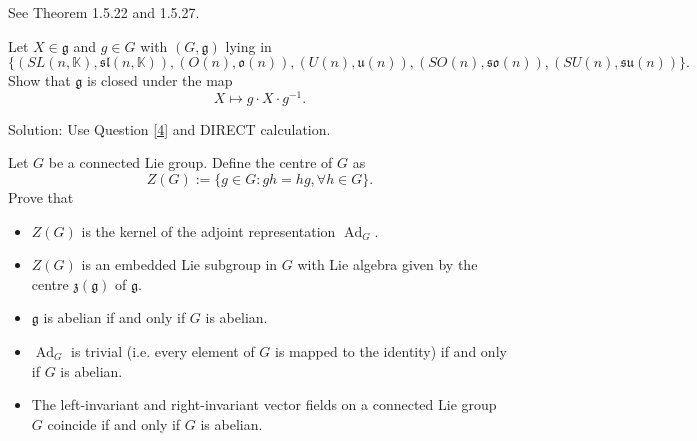 See \cite{Ha} Theorem 1.5.22 and 1.5.27.

\begin{exercise}
    Let $X \in \mathfrak{g}$ and $g\in G$ with $(G,\mathfrak{g})$ lying in
    \begin{equation*}
        \{
            (SL(n,\mathbb{K}),\mathfrak{sl}(n,\mathbb{K})),
            (O(n),\mathfrak{o}(n)),
            (U(n),\mathfrak{u}(n)),
            (SO(n),\mathfrak{so}(n)),
            (SU(n),\mathfrak{su}(n))
        \}.
    \end{equation*}
    Show that $\mathfrak{g}$ is closed under the map
    \begin{equation*}
        X\mapsto g\cdot X\cdot g^{-1}.
    \end{equation*}
\end{exercise}

Solution: Use Question \ref{4} and DIRECT calculation.

\begin{exercise}
    Let $G$ be a connected Lie group. Define the centre of $G$ as
    \begin{equation*}
        Z(G):=\{
            g\in G:gh=hg ,\forall h \in G
        \}.
    \end{equation*}
    Prove that
    \begin{itemize}
        \item $Z(G)$ is the kernel of the adjoint representation 
        $\operatorname{Ad}_G$.
        
        \item $Z(G)$ is an embedded Lie subgroup in $G$ with
        Lie algebra given by the centre $\mathfrak{z}(\mathfrak{g})$ of $\mathfrak{g}$.

        \item $\mathfrak{g}$ is abelian if and only if $G$ is abelian.

        \item $\operatorname{Ad}_G$ is trivial 
        (i.e. every element of $G$ is mapped to the identity) 
        if and only if $G$ is abelian.

        \item The left-invariant and right-invariant vector fields on a connected 
        Lie group $G$ coincide if and only if $G$ is abelian.
    \end{itemize}
\end{exercise}

